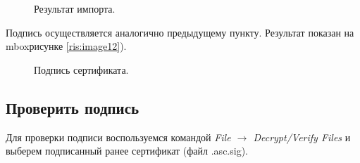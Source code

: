 \documentclass[10pt,a4paper,titlepage]{article}
\begin{document}
\begin{figure}[!h]	
\caption{Результат импорта.}
\label{ris:image13}
\end{figure}

Подпись осуществляется аналогично предыдущему пункту. Результат показан на mbox{рисунке \ref{ris:image12})}.

\begin{figure}[!h]	
\caption{Подпись сертификата.}
\label{ris:image14}
\end{figure}

\subsection{Проверить подпись}
Для проверки подписи воспользуемся командой \textit{File $\rightarrow$ Decrypt/Verify Files} и выберем подписанный ранее сертификат (файл .asc.sig).
\end{document}
